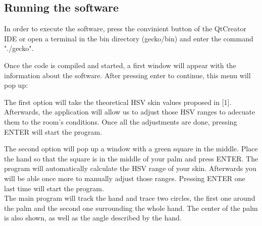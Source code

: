 \subsection{Running the software}

In order to execute the software, press the convinient button of the QtCreator IDE or open a terminal in the bin directory (gecko/bin) and enter the command "./gecko". 

Once the code is compiled and started, a first window will appear with the information about the software. After pressing enter to continue, this menu will pop up: 
\begin{center}
\end{center}

\vspace{1cm}
The first option will take the theoretical HSV skin values proposed in [1]. Afterwards, the application will allow us to adjust those HSV ranges to adecuate them to the room's conditions. 
Once all the adjustments are done, pressing ENTER will start the program. 

The second option will pop up a window with a green square in the middle. Place the hand so that the square is in the middle of your palm and press ENTER. The program will automatically calculate the HSV range of your skin. Afterwards you will be able once more to manually adjust those ranges. Pressing ENTER one last time will start the program. 
\\
 
The main program will track the hand and trace two circles, the first one around the palm and the second one surrounding the whole hand. The center of the palm is also shown, as well as the angle described by the hand. 

